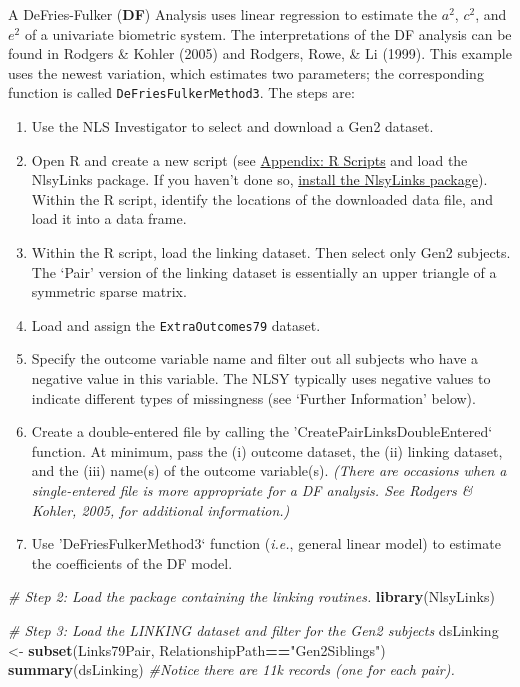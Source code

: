 \documentclass[smallextended]{svjour3}       %
\newenvironment{Shaded}{\begin{snugshade}}{\end{snugshade}}
\newcommand{\CommentTok}[1]{\textcolor[rgb]{0.56,0.35,0.01}{\textit{#1}}}
\newcommand{\KeywordTok}[1]{\textcolor[rgb]{0.13,0.29,0.53}{\textbf{#1}}}
\newcommand{\NormalTok}[1]{#1}
\newcommand{\OperatorTok}[1]{\textcolor[rgb]{0.81,0.36,0.00}{\textbf{#1}}}
\newcommand{\StringTok}[1]{\textcolor[rgb]{0.31,0.60,0.02}{#1}}
\begin{document}
A DeFries-Fulker (\textbf{DF}) Analysis uses linear regression to
estimate the \(a^2\), \(c^2\), and \(e^2\) of a univariate biometric
system. The interpretations of the DF analysis can be found in Rodgers
\& Kohler (2005) and Rodgers, Rowe, \& Li (1999). This example uses the
newest variation, which estimates two parameters; the corresponding
function is called \texttt{DeFriesFulkerMethod3}. The steps are:

\begin{enumerate}
\def\labelenumi{\arabic{enumi}.}
\item
  Use the NLS Investigator to select and download a Gen2 dataset.
\item
  Open R and create a new script (see
  \protect\hyperlink{appendix-creating-and-saving-r-scripts}{Appendix: R
  Scripts} and load the NlsyLinks package. If you haven't done so,
  \protect\hyperlink{appendix-installing-and-loading-the-nlsylinks-package}{install
  the NlsyLinks package}). Within the R script, identify the locations
  of the downloaded data file, and load it into a data frame.
\item
  Within the R script, load the linking dataset. Then select only Gen2
  subjects. The `Pair' version of the linking dataset is essentially an
  upper triangle of a symmetric sparse matrix.
\item
  Load and assign the \texttt{ExtraOutcomes79} dataset.
\item
  Specify the outcome variable name and filter out all subjects who have
  a negative value in this variable. The NLSY typically uses negative
  values to indicate different types of missingness (see `Further
  Information' below).
\item
  Create a double-entered file by calling the
  'CreatePairLinksDoubleEntered` function. At minimum, pass the (i)
  outcome dataset, the (ii) linking dataset, and the (iii) name(s) of
  the outcome variable(s). \emph{(There are occasions when a
  single-entered file is more appropriate for a DF analysis. See Rodgers
  \& Kohler, 2005, for additional information.)}
\item
  Use 'DeFriesFulkerMethod3` function (\emph{i.e.}, general linear
  model) to estimate the coefficients of the DF model.
\end{enumerate}

\begin{Shaded}
\begin{Highlighting}[]
\CommentTok{# Step 2: Load the package containing the linking routines.}
\KeywordTok{library}\NormalTok{(NlsyLinks)}

\CommentTok{# Step 3: Load the LINKING dataset and filter for the Gen2 subjects}
\NormalTok{dsLinking <-}\StringTok{ }\KeywordTok{subset}\NormalTok{(Links79Pair, RelationshipPath}\OperatorTok{==}\StringTok{"Gen2Siblings"}\NormalTok{)}
\KeywordTok{summary}\NormalTok{(dsLinking) }\CommentTok{#Notice there are 11k records (one for each pair).}
\end{Highlighting}
\end{Shaded}
\end{document}
